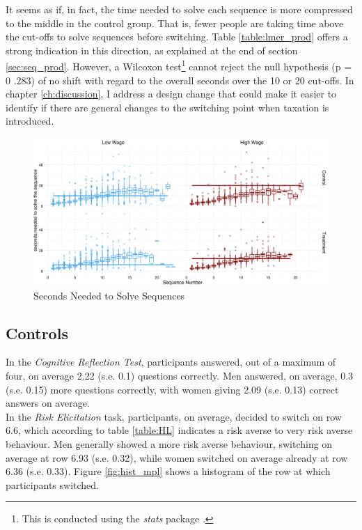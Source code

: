 It seems as if, in fact, the time needed to solve each sequence is more compressed to the middle in the control group. That is, fewer people are taking time above the cut-offs to solve sequences before switching. Table \ref{table:lmer_prod} offers a strong indication in this direction, as explained at the end of section \ref{sec:seq_prod}. However, a Wilcoxon test\footnote{This is conducted using the \textit{stats} package \cite{rcoreteam2014}.} cannot reject the null hypothesis (p = 0 .283) of no shift with regard to the overall seconds over the 10 or 20 cut-offs. In chapter \ref{ch:discussion}, I address a design change that could make it easier to identify if there are general changes to the switching point when taxation is introduced.\\

\begin{figure}
    \centering
    \includegraphics[width=\textwidth]{graphs/time_task_grid.png}
    \caption{Seconds Needed to Solve Sequences}
    \label{fig:time_per_task}
\end{figure}

\subsection{Controls}

In the \textit{Cognitive Reflection Test}, participants answered, out of a maximum of four, on average 2.22 (s.e. 0.1) questions correctly. Men answered, on average, 0.3 (s.e. 0.15) more questions correctly, with women giving 2.09 (s.e. 0.13) correct answers on average.\\

In the \textit{Risk Elicitation} task, participants, on average, decided to switch on row 6.6, which according to table \ref{table:HL} indicates a risk averse to very risk averse behaviour. Men generally showed a more risk averse behaviour, switching on average at row 6.93 (s.e. 0.32), while women switched on average already at row 6.36 (s.e. 0.33). Figure \ref{fig:hist_mpl} shows a histogram of the row at which participants switched.\\

